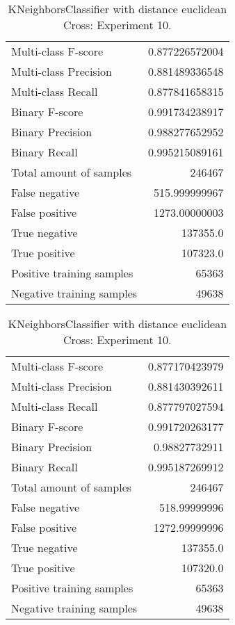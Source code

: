 \begin{table}[H]
\begin{minipage}{0.5\textwidth}
\caption{KNeighborsClassifier with distance euclidean Cross: Experiment 9.}
\centering
\begin{tabular}{l r}
\toprule
Multi-class F-score & 0.877226572004 \\
Multi-class Precision & 0.881489336548 \\
Multi-class Recall & 0.877841658315 \\
\midrule
Binary F-score & 0.991734238917 \\
Binary Precision & 0.988277652952 \\
Binary Recall & 0.995215089161 \\
\midrule
Total amount of samples & 246467 \\
False negative & 515.999999967 \\
False positive & 1273.00000003 \\
True negative & 137355.0 \\
True positive & 107323.0 \\
\midrule
Positive training samples & 65363 \\
Negative training samples & 49638 \\
\bottomrule
\end{tabular}
\end{minipage}
\hfillx
\begin{minipage}{0.5\textwidth}
\caption{KNeighborsClassifier with distance euclidean Cross: Experiment 10.}
\centering
\begin{tabular}{l r}
\toprule
Multi-class F-score & 0.877170423979 \\
Multi-class Precision & 0.881430392611 \\
Multi-class Recall & 0.877797027594 \\
\midrule
Binary F-score & 0.991720263177 \\
Binary Precision & 0.98827732911 \\
Binary Recall & 0.995187269912 \\
\midrule
Total amount of samples & 246467 \\
False negative & 518.99999996 \\
False positive & 1272.99999996 \\
True negative & 137355.0 \\
True positive & 107320.0 \\
\midrule
Positive training samples & 65363 \\
Negative training samples & 49638 \\
\bottomrule
\end{tabular}
\end{minipage}
\end{table}
